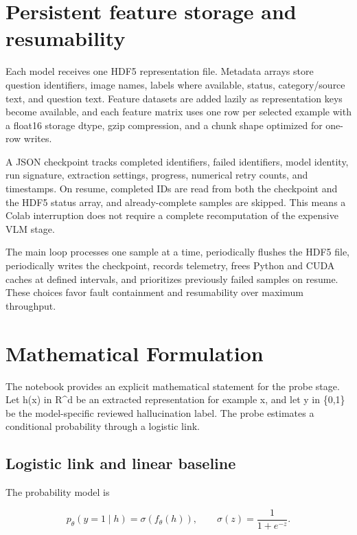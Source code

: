 \documentclass[11pt,a4paper]{article}
\begin{document}
\section{Persistent feature storage and resumability}

Each model receives one HDF5 representation file. Metadata arrays store question identifiers, image names, labels where available, status, category/source text, and question text. Feature datasets are added lazily as representation keys become available, and each feature matrix uses one row per selected example with a float16 storage dtype, gzip compression, and a chunk shape optimized for one-row writes.

A JSON checkpoint tracks completed identifiers, failed identifiers, model identity, run signature, extraction settings, progress, numerical retry counts, and timestamps. On resume, completed IDs are read from both the checkpoint and the HDF5 status array, and already-complete samples are skipped. This means a Colab interruption does not require a complete recomputation of the expensive VLM stage.

The main loop processes one sample at a time, periodically flushes the HDF5 file, periodically writes the checkpoint, records telemetry, frees Python and CUDA caches at defined intervals, and prioritizes previously failed samples on resume. These choices favor fault containment and resumability over maximum throughput.

\section{Mathematical Formulation}

The notebook provides an explicit mathematical statement for the probe stage. Let h(x) in R\textasciicircum{}d be an extracted representation for example x, and let y in \{0,1\} be the model-specific reviewed hallucination label. The probe estimates a conditional probability through a logistic link.

\subsection{Logistic link and linear baseline}

The probability model is

\begin{equation}
p_{\theta}(y=1\mid h)=\sigma\!\left(f_{\theta}(h)\right),\qquad
\sigma(z)=\frac{1}{1+e^{-z}}.
\label{eq:logistic-link}
\end{equation}
\end{document}
